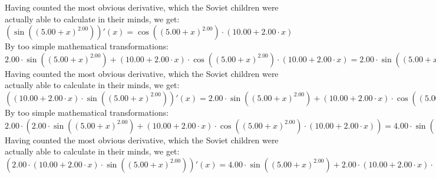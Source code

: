 \documentclass{article}
\begin{document}
 \newline
 \newline 
Having counted the most obvious derivative, which the Soviet children were actually able to calculate in their minds, we get:
$( \sin {\left({\left({{5.00} + {x}}\right) ^ {2.00}}\right)} )'(x) = { \cos {\left({\left({{5.00} + {x}}\right) ^ {2.00}}\right)}  \cdot \left({{10.00} + {{2.00} \cdot {x}}}\right)}$\newline
\newline
By too simple mathematical transformations:
 ${{{2.00} \cdot  \sin {\left({\left({{5.00} + {x}}\right) ^ {2.00}}\right)} } + {\left({{10.00} + {{2.00} \cdot {x}}}\right) \cdot { \cos {\left({\left({{5.00} + {x}}\right) ^ {2.00}}\right)}  \cdot \left({{10.00} + {{2.00} \cdot {x}}}\right)}}} = {{{2.00} \cdot  \sin {\left({\left({{5.00} + {x}}\right) ^ {2.00}}\right)} } + {\left({{10.00} + {{2.00} \cdot {x}}}\right) \cdot { \cos {\left({\left({{5.00} + {x}}\right) ^ {2.00}}\right)}  \cdot \left({{10.00} + {{2.00} \cdot {x}}}\right)}}}$ 
 \newline
 \newline 
Having counted the most obvious derivative, which the Soviet children were actually able to calculate in their minds, we get:
$({\left({{10.00} + {{2.00} \cdot {x}}}\right) \cdot  \sin {\left({\left({{5.00} + {x}}\right) ^ {2.00}}\right)} })'(x) = {{{2.00} \cdot  \sin {\left({\left({{5.00} + {x}}\right) ^ {2.00}}\right)} } + {\left({{10.00} + {{2.00} \cdot {x}}}\right) \cdot { \cos {\left({\left({{5.00} + {x}}\right) ^ {2.00}}\right)}  \cdot \left({{10.00} + {{2.00} \cdot {x}}}\right)}}}$\newline
\newline
By too simple mathematical transformations:
 ${{2.00} \cdot \left({{{2.00} \cdot  \sin {\left({\left({{5.00} + {x}}\right) ^ {2.00}}\right)} } + {\left({{10.00} + {{2.00} \cdot {x}}}\right) \cdot { \cos {\left({\left({{5.00} + {x}}\right) ^ {2.00}}\right)}  \cdot \left({{10.00} + {{2.00} \cdot {x}}}\right)}}}\right)} = {{{4.00} \cdot  \sin {\left({\left({{5.00} + {x}}\right) ^ {2.00}}\right)} } + {{2.00} \cdot {\left({{10.00} + {{2.00} \cdot {x}}}\right) \cdot { \cos {\left({\left({{5.00} + {x}}\right) ^ {2.00}}\right)}  \cdot \left({{10.00} + {{2.00} \cdot {x}}}\right)}}}}$ 
 \newline
 \newline 
Having counted the most obvious derivative, which the Soviet children were actually able to calculate in their minds, we get:
$({{2.00} \cdot {\left({{10.00} + {{2.00} \cdot {x}}}\right) \cdot  \sin {\left({\left({{5.00} + {x}}\right) ^ {2.00}}\right)} }})'(x) = {{{4.00} \cdot  \sin {\left({\left({{5.00} + {x}}\right) ^ {2.00}}\right)} } + {{2.00} \cdot {\left({{10.00} + {{2.00} \cdot {x}}}\right) \cdot { \cos {\left({\left({{5.00} + {x}}\right) ^ {2.00}}\right)}  \cdot \left({{10.00} + {{2.00} \cdot {x}}}\right)}}}}$\newline
\end{document}
